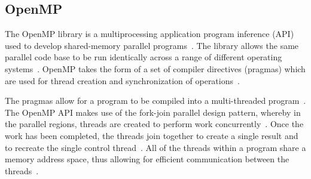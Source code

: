 \documentclass[10pt,twocolumn]{witseiepaper}
\begin{document}
%

\subsection{OpenMP}

The OpenMP library is a multiprocessing application program inference (API) used to develop shared-memory parallel programs~\cite{comparingMPIMapReduce}. The library allows the same parallel code base to be run identically across a range of different operating systems~\cite{comparingMPIMapReduce}. OpenMP takes the form of a set of compiler directives (pragmas) which are used for thread creation and synchronization of operations~\cite{comparingMPIMapReduce}. 

The pragmas allow for a program to be compiled into a multi-threaded program~\cite{kuhn2000openmp}. The OpenMP API makes use of the fork-join parallel design pattern, whereby in the parallel regions, threads are created to perform work concurrently~\cite{openMP}. Once the work has been completed, the threads join together to create a single result and to recreate the single control thread~\cite{openMP}. All of the threads within a program share a memory address space, thus allowing for efficient communication between the threads~\cite{comparingMPIMapReduce}. 
\end{document}
